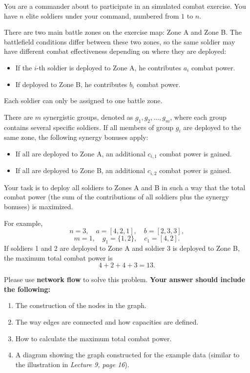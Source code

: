\problem{}

You are a commander about to participate in an simulated combat exercise.  
You have $n$ elite soldiers under your command, numbered from $1$ to $n$.

There are two main battle zones on the exercise map: Zone A and Zone B.  
The battlefield conditions differ between these two zones, so the same soldier may have different combat effectiveness depending on where they are deployed:
\begin{itemize}
    \item If the $i$-th soldier is deployed to Zone A, he contributes $a_i$ combat power.
    \item If deployed to Zone B, he contributes $b_i$ combat power.
\end{itemize}

Each soldier can only be assigned to one battle zone.

There are $m$ synergistic groups, denoted as $g_1, g_2, \dots, g_m$, where each group contains several specific soldiers.  
If all members of group $g_i$ are deployed to the same zone, the following synergy bonuses apply:
\begin{itemize}
    \item If all are deployed to Zone A, an additional $c_{i,1}$ combat power is gained.
    \item If all are deployed to Zone B, an additional $c_{i,2}$ combat power is gained.
\end{itemize}

Your task is to deploy all soldiers to Zones A and B in such a way that the total combat power (the sum of the contributions of all soldiers plus the synergy bonuses) is maximized.

For example,
\[
n = 3, \quad a = [4, 2, 1], \quad b = [2, 3, 3],
\]
\[
m = 1, \quad g_1 = \{1, 2\}, \quad c_1 = [4, 2].
\]
If soldiers 1 and 2 are deployed to Zone A and soldier 3 is deployed to Zone B,  
the maximum total combat power is
\[
4 + 2 + 4 + 3 = 13.
\]

Please use \textbf{network flow} to solve this problem.  
\textbf{Your answer should include the following:}
\begin{enumerate}
    \item The construction of the nodes in the graph.
    \item The way edges are connected and how capacities are defined.
    \item How to calculate the maximum total combat power.
    \item A diagram showing the graph constructed for the example data (similar to the illustration in \emph{Lecture 9, page 16}).
\end{enumerate}

